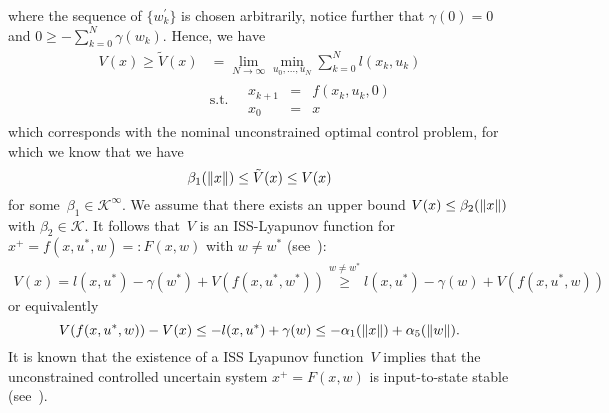 %
where the sequence of $\{w_k^\prime\}$ is chosen arbitrarily, notice further that $\gamma(0)=0$ and $0\geq-\sum_{k=0}^N\gamma(w_k)$.
%
Hence, we have
%
\begin{equation}\begin{split}
	V(x)\geq \tilde V(x) &= \lim_{N\rightarrow\infty}\min_{u_0,\dots,u_N}\sum_{k=0}^N l(x_k,u_k)\\
	&\text{s.t.}\quad\begin{array}{rcl}
	x_{k+1} &=& f(x_k,u_k,0)\\
	x_0 &=& x
	\end{array}
\end{split}\end{equation}
%
which corresponds with the nominal unconstrained optimal control problem, for which we know that we have
%
\begin{equation}\label{eq:concepts:lower:bound:on:inf:cost}
	\beta_1(\left\|x\right\|)\leq\tilde{V}(x)\leq V(x)
\end{equation}
%
for some~$\beta_1\in\mathcal K^\infty$. 
%
We assume that there exists an upper bound $V(x)\leq\beta_2(\left\|x\right\|)$ with $\beta_2\in\mathcal K$.
%
It follows that~$V$ is an ISS-Lyapunov function for $x^+ = f(x,u^\ast,w) =: F(x,w)$ with $w\neq w^\ast$ (see~\cite{Jiang:2001}):
%
\begin{equation}\begin{split}
	V(x) = l(x,u^\ast)-\gamma(w^\ast) + V(f(x,u^\ast,w^\ast)) \overset{w\neq w^\ast}{\geq} 
	l(x,u^\ast)-\gamma(w) + V(f(x,u^\ast,w))
\end{split}\end{equation}
%
or equivalently
%
\begin{equation}\label{eq:concepts:ISS:condition:cost:to:go}
	V(f(x,u^\ast,w)) - V(x) \leq -l(x,u^\ast) + \gamma(w) \leq - \alpha_1(\left\|x\right\|) + \alpha_5(\left\|w\right\|).
\end{equation}
%
It is known that the existence of a ISS Lyapunov function~$V$ implies that the unconstrained controlled 
uncertain system $x^+ = F(x,w)$ is input-to-state stable (see~\cite{Jiang:2001}).

